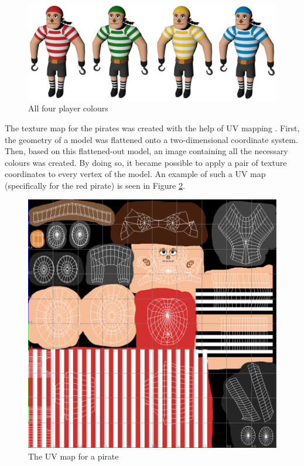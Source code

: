 \begin{figure}[h!]
	\centering
	\includegraphics[width=\textwidth]{figures/pirate_rainbow.png}
	\caption{All four player colours \label{fig:pirate_rainbow}}
\end{figure}

The texture map for the pirates was created with the help of UV mapping \cite{TextureMapping}. First, the geometry of a model was flattened onto a two-dimensional coordinate system. Then, based on this flattened-out model, an image containing all the necessary colours was created. By doing so, it became possible to apply a pair of texture coordinates to every vertex of the model. An example of such a UV map (specifically for the red pirate) is seen in Figure \ref{fig:uv_map}.

\begin{figure}[h!]
	\centering
	\includegraphics[width=\textwidth]{figures/uv_map.png}
	\caption{The UV map for a pirate \label{fig:uv_map}}
\end{figure}

